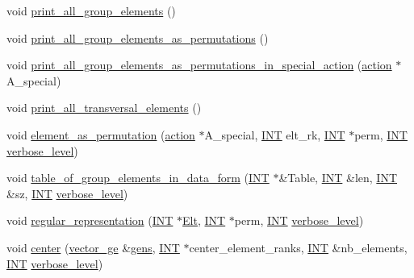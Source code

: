 \begin{DoxyCompactItemize}
void \mbox{\hyperlink{classsims_a000c1f285c6678fe7f591ced343588aa}{print\+\_\+all\+\_\+group\+\_\+elements}} ()
\item 
void \mbox{\hyperlink{classsims_ad3c082db18cfacc6d11206ccb984ef25}{print\+\_\+all\+\_\+group\+\_\+elements\+\_\+as\+\_\+permutations}} ()
\item 
void \mbox{\hyperlink{classsims_aa117d84d5f8814bb566e170113355791}{print\+\_\+all\+\_\+group\+\_\+elements\+\_\+as\+\_\+permutations\+\_\+in\+\_\+special\+\_\+action}} (\mbox{\hyperlink{classaction}{action}} $\ast$A\+\_\+special)
\item 
void \mbox{\hyperlink{classsims_ac8dc8f09ae341b1b858b14221bb7646b}{print\+\_\+all\+\_\+transversal\+\_\+elements}} ()
\item 
void \mbox{\hyperlink{classsims_ad0740e3e94b3e417dbedf96666cd9add}{element\+\_\+as\+\_\+permutation}} (\mbox{\hyperlink{classaction}{action}} $\ast$A\+\_\+special, \mbox{\hyperlink{galois_8h_a09fddde158a3a20bd2dcadb609de11dc}{I\+NT}} elt\+\_\+rk, \mbox{\hyperlink{galois_8h_a09fddde158a3a20bd2dcadb609de11dc}{I\+NT}} $\ast$perm, \mbox{\hyperlink{galois_8h_a09fddde158a3a20bd2dcadb609de11dc}{I\+NT}} \mbox{\hyperlink{simeon_8_c_a818073fbcc2f439e7c56952f67386122}{verbose\+\_\+level}})
\item 
void \mbox{\hyperlink{classsims_a311a6a637777448f31209da4f9c2d8e3}{table\+\_\+of\+\_\+group\+\_\+elements\+\_\+in\+\_\+data\+\_\+form}} (\mbox{\hyperlink{galois_8h_a09fddde158a3a20bd2dcadb609de11dc}{I\+NT}} $\ast$\&Table, \mbox{\hyperlink{galois_8h_a09fddde158a3a20bd2dcadb609de11dc}{I\+NT}} \&len, \mbox{\hyperlink{galois_8h_a09fddde158a3a20bd2dcadb609de11dc}{I\+NT}} \&sz, \mbox{\hyperlink{galois_8h_a09fddde158a3a20bd2dcadb609de11dc}{I\+NT}} \mbox{\hyperlink{simeon_8_c_a818073fbcc2f439e7c56952f67386122}{verbose\+\_\+level}})
\item 
void \mbox{\hyperlink{classsims_ac445ae3fa3933272cbc36a711a1de17f}{regular\+\_\+representation}} (\mbox{\hyperlink{galois_8h_a09fddde158a3a20bd2dcadb609de11dc}{I\+NT}} $\ast$\mbox{\hyperlink{simeon_8_c_aec1406935bdb1fee3561fcb840964100}{Elt}}, \mbox{\hyperlink{galois_8h_a09fddde158a3a20bd2dcadb609de11dc}{I\+NT}} $\ast$perm, \mbox{\hyperlink{galois_8h_a09fddde158a3a20bd2dcadb609de11dc}{I\+NT}} \mbox{\hyperlink{simeon_8_c_a818073fbcc2f439e7c56952f67386122}{verbose\+\_\+level}})
\item 
void \mbox{\hyperlink{classsims_a86c7915d8d90083fd46b4019bd6c26c3}{center}} (\mbox{\hyperlink{classvector__ge}{vector\+\_\+ge}} \&\mbox{\hyperlink{classsims_ac1db131c547341a79a8955526bf8cdf6}{gens}}, \mbox{\hyperlink{galois_8h_a09fddde158a3a20bd2dcadb609de11dc}{I\+NT}} $\ast$center\+\_\+element\+\_\+ranks, \mbox{\hyperlink{galois_8h_a09fddde158a3a20bd2dcadb609de11dc}{I\+NT}} \&nb\+\_\+elements, \mbox{\hyperlink{galois_8h_a09fddde158a3a20bd2dcadb609de11dc}{I\+NT}} \mbox{\hyperlink{simeon_8_c_a818073fbcc2f439e7c56952f67386122}{verbose\+\_\+level}})

\end{DoxyCompactItemize}
